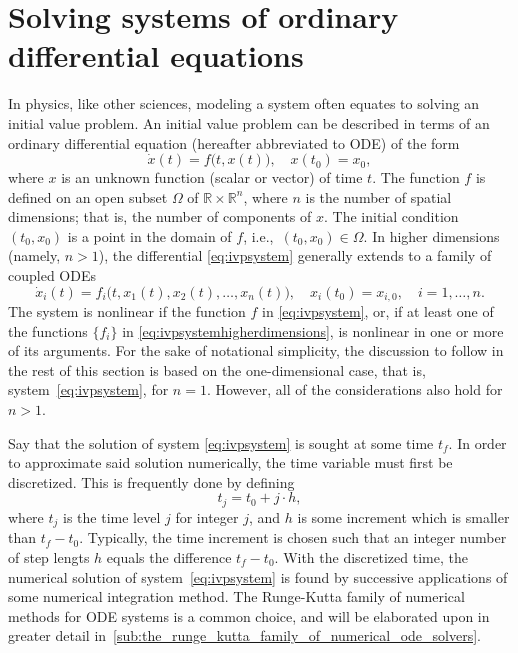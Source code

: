 \section[Solving systems of ordinary differential equations]%
{Solving systems of ordinary differential eq\null{}uations}%
\label{sec:solving_systems_of_ordinary_differential_equations}

In physics, like other sciences, modeling a system often equates to solving an
initial value problem. An initial value problem can be described in terms of an
ordinary differential equation (hereafter abbreviated to ODE) of the form
\begin{equation}
    \label{eq:ivpsystem}
    \dot{x}(t) = f\big(t,x(t)\big), \quad x(t_{0}) = x_{0},
\end{equation}
where $x$ is an unknown function (scalar or vector) of time $t$. The function
$f$ is defined on an open subset $\Omega$ of $\mathbb{R}\times\mathbb{R}^{n}$,
where $n$ is the number of spatial dimensions; that is, the number of
components of $x$. The initial condition $(t_{0},x_{0})$ is a point in the
domain of $f$, i.e.,\ $(t_{0},x_{0})\in\Omega$. In higher dimensions (namely,
$n>1$), the differential \cref{eq:ivpsystem} generally extends to a family of
coupled ODEs
\begin{equation}
    \label{eq:ivpsystemhigherdimensions}
    \dot{x}_{i}(t) = f_{i}\big(t,x_{1}(t),x_{2}(t),\ldots,x_{n}(t)\big),%
    \quad x_{i}(t_{0}) = x_{i,0}, \quad i = 1,\ldots,n.
\end{equation}
The system is nonlinear if the function $f$ in \cref{eq:ivpsystem}, or, if at
least one of the functions $\{f_{i}\}$ in \cref{eq:ivpsystemhigherdimensions},
is nonlinear in one or more of its arguments. For the sake of notational
simplicity, the discussion to follow in the rest of this section is based
on the one-dimensional case, that is, system~\eqref{eq:ivpsystem}, for $n=1$.
However, all of the considerations also hold for $n>1$.

Say that the solution of system \eqref{eq:ivpsystem} is sought at some time
$t_{f}$. In order to approximate said solution numerically, the time variable
must first be discretized. This is frequently done by defining
\begin{equation}
    \label{eq:discretime}
    t_{j} = t_{0}+j\cdot{}h,
\end{equation}
where $t_{j}$ is the time level $j$ for integer $j$, and $h$ is some increment
which is smaller than $t_{f}-t_{0}$. Typically, the time increment is chosen
such that an integer number of step lengts $h$ equals the difference
$t_{f}-t_{0}$. With the discretized time, the numerical solution of
system~\eqref{eq:ivpsystem} is found by successive applications of some
numerical integration method. The Runge-Kutta family of numerical methods for
ODE systems is a common choice, and will be elaborated upon in greater detail
in~\cref{sub:the_runge_kutta_family_of_numerical_ode_solvers}.

